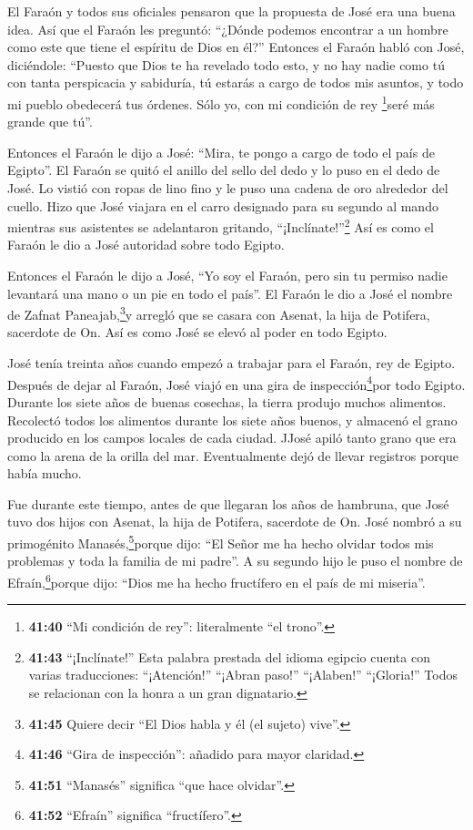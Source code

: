  El Faraón y todos sus oficiales pensaron que la propuesta
de José era una buena idea.  Así que el Faraón les
preguntó: ``¿Dónde podemos encontrar a un hombre como este que tiene el
espíritu de Dios en él?''  Entonces el Faraón habló con
José, diciéndole: ``Puesto que Dios te ha revelado todo esto, y no hay
nadie como tú con tanta perspicacia y sabiduría,  tú
estarás a cargo de todos mis asuntos, y todo mi pueblo obedecerá tus
órdenes. Sólo yo, con mi condición de rey \footnote{\textbf{41:40} ``Mi
  condición de rey'': literalmente ``el trono''.}seré más grande que
tú''.

 Entonces el Faraón le dijo a José: ``Mira, te pongo a
cargo de todo el país de Egipto''.  El Faraón se quitó el
anillo del sello del dedo y lo puso en el dedo de José. Lo vistió con
ropas de lino fino y le puso una cadena de oro alrededor del cuello.
 Hizo que José viajara en el carro designado para su
segundo al mando mientras sus asistentes se adelantaron gritando,
``¡Inclínate!''\footnote{\textbf{41:43} ``¡Inclínate!'' Esta palabra
  prestada del idioma egipcio cuenta con varias traducciones:
  ``¡Atención!'' ``¡Abran paso!'' ``¡Alaben!'' ``¡Gloria!'' Todos se
  relacionan con la honra a un gran dignatario.} Así es como el Faraón
le dio a José autoridad sobre todo Egipto.

 Entonces el Faraón le dijo a José, ``Yo soy el Faraón,
pero sin tu permiso nadie levantará una mano o un pie en todo el país''.
 El Faraón le dio a José el nombre de Zafnat
Paneajab,\footnote{\textbf{41:45} Quiere decir ``El Dios habla y él (el
  sujeto) vive''.}y arregló que se casara con Asenat, la hija de
Potifera, sacerdote de On. Así es como José se elevó al poder en todo
Egipto.

 José tenía treinta años cuando empezó a trabajar para el
Faraón, rey de Egipto. Después de dejar al Faraón, José viajó en una
gira de inspección\footnote{\textbf{41:46} ``Gira de inspección'':
  añadido para mayor claridad.}por todo Egipto.  Durante
los siete años de buenas cosechas, la tierra produjo muchos alimentos.
 Recolectó todos los alimentos durante los siete años
buenos, y almacenó el grano producido en los campos locales de cada
ciudad.  JJosé apiló tanto grano que era como la arena de
la orilla del mar. Eventualmente dejó de llevar registros porque había
mucho.

 Fue durante este tiempo, antes de que llegaran los años de
hambruna, que José tuvo dos hijos con Asenat, la hija de Potifera,
sacerdote de On.  José nombró a su primogénito
Manasés,\footnote{\textbf{41:51} ``Manasés'' significa ``que hace
  olvidar''.}porque dijo: ``El Señor me ha hecho olvidar todos mis
problemas y toda la familia de mi padre''.  A su segundo
hijo le puso el nombre de Efraín,\footnote{\textbf{41:52} ``Efraín''
  significa ``fructífero''.}porque dijo: ``Dios me ha hecho fructífero
en el país de mi miseria''.

